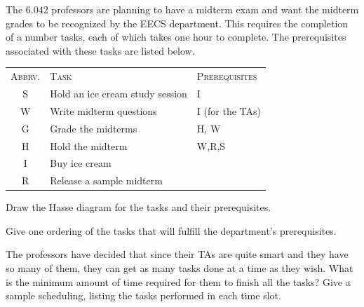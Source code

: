 \documentclass[12pt,oneside]{article}
\begin{document}
\begin{problem}{20}
The $6.042$ professors are planning to have a midterm exam and want the midterm grades to be recognized by the EECS department. This requires the completion of a number
tasks, each of which takes one hour to complete.  The prerequisites associated with these tasks are
listed below.
\begin{center}
\begin{tabular}{cll}
\textsc{Abbrv.} & \textsc{Task} & \textsc{Prerequisites} \\
S & Hold an ice cream study session & I\\
W & Write midterm questions &  I (for the TAs)\\
G & Grade the midterms & H, W\\
H & Hold the midterm & W,R,S \\
I & Buy ice cream &  \\
R & Release a sample midterm & 
\end{tabular}
\end{center}

\bparts

 Draw the Hasse diagram for the tasks and their
prerequisites.
  

 Give one ordering of the tasks that will fulfill the department's prerequisites.

 The professors have decided that since their TAs are quite
smart and they have so many of them, they can get as many tasks done at a time as
they wish.  What is the minimum amount of time required for them to
finish all the tasks? Give a sample scheduling, listing the tasks performed in each time slot.


\end{problem}
\end{document}
